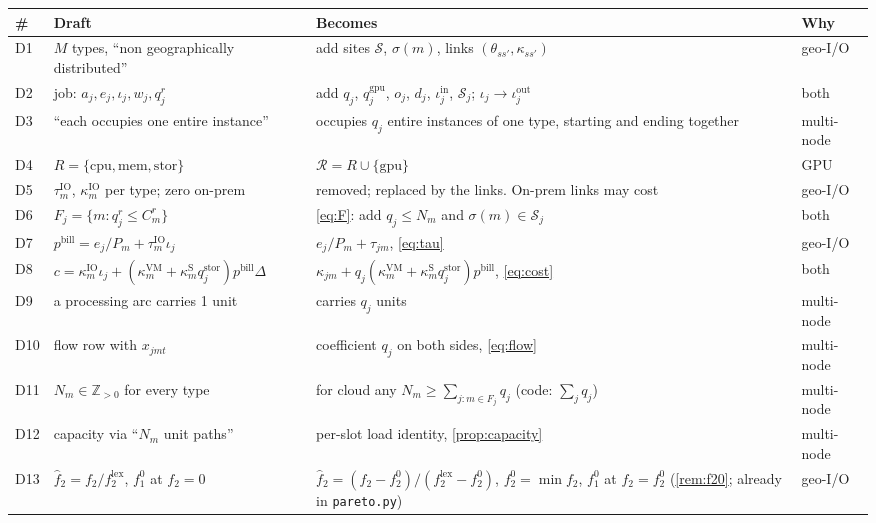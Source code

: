 \documentclass[11pt,a4paper]{article}
\newcommand{\Sites}{\mathcal{S}}
\newcommand{\Res}{\mathcal{R}}
\newcommand{\Z}{\mathbb{Z}}
\newcommand{\code}[1]{\texttt{#1}}
\newcommand{\pin}{\mathrm{in}}
\newcommand{\pout}{\mathrm{out}}
\newcommand{\bill}{\mathrm{bill}}
\begin{document}
\begin{center}
\renewcommand{\arraystretch}{1.15}
\begin{longtable}{@{}p{0.8cm}p{3.0cm}p{4.6cm}p{5.3cm}@{}}
\toprule
\# & Draft & Becomes & Why \\
\midrule
\endhead
D1 & $M$ types, ``non geographically distributed'' & add sites $\Sites$, $\sigma(m)$, links $(\theta_{ss'},\kappa_{ss'})$ & geo-I/O \\
D2 & job: $a_j,e_j,\iota_j,w_j,q^r_j$ & add $q_j$, $q^{\mathrm{gpu}}_j$, $o_j$, $d_j$, $\iota^\pin_j$, $\Sites_j$; $\iota_j\to\iota^\pout_j$ & both \\
D3 & ``each occupies one entire instance'' & occupies $q_j$ entire instances of one type, starting and ending together & multi-node \\
D4 & $R=\{\mathrm{cpu},\mathrm{mem},\mathrm{stor}\}$ & $\Res=R\cup\{\mathrm{gpu}\}$ & GPU \\
D5 & $\tau^{\mathrm{IO}}_m$, $\kappa^{\mathrm{IO}}_m$ per type; zero on-prem & removed; replaced by the links. On-prem links may cost & geo-I/O \\
D6 & $F_j=\{m:q^r_j\le C^r_m\}$ & \eqref{eq:F}: add $q_j\le N_m$ and $\sigma(m)\in\Sites_j$ & both \\
D7 & $p^\bill=e_j/P_m+\tau^{\mathrm{IO}}_m\iota_j$ & $e_j/P_m+\tau_{jm}$, \eqref{eq:tau} & geo-I/O \\
D8 & $c=\kappa^{\mathrm{IO}}_m\iota_j+(\kappa^{\mathrm{VM}}_m+\kappa^{\mathrm{S}}_mq^{\mathrm{stor}}_j)p^\bill\Delta$ & $\kappa_{jm}+q_j(\kappa^{\mathrm{VM}}_m+\kappa^{\mathrm{S}}_mq^{\mathrm{stor}}_j)p^\bill$, \eqref{eq:cost} & both \\
D9 & a processing arc carries 1 unit & carries $q_j$ units & multi-node \\
D10 & flow row with $x_{jmt}$ & coefficient $q_j$ on both sides, \eqref{eq:flow} & multi-node \\
D11 & $N_m\in\Z_{>0}$ for every type & for cloud any $N_m\ge\sum_{j:m\in F_j}q_j$ (code: $\sum_jq_j$) & multi-node \\
D12 & capacity via ``$N_m$ unit paths'' & per-slot load identity, \cref{prop:capacity} & multi-node \\
D13 & $\widehat f_2=f_2/f_2^{\mathrm{lex}}$, $f_1^0$ at $f_2=0$ & $\widehat f_2=(f_2-f_2^0)/(f_2^{\mathrm{lex}}-f_2^0)$, $f_2^0=\min f_2$, $f_1^0$ at $f_2=f_2^0$ (\cref{rem:f20}; already in \code{pareto.py}) & geo-I/O \\
\bottomrule
\end{longtable}
\end{center}
\end{document}
